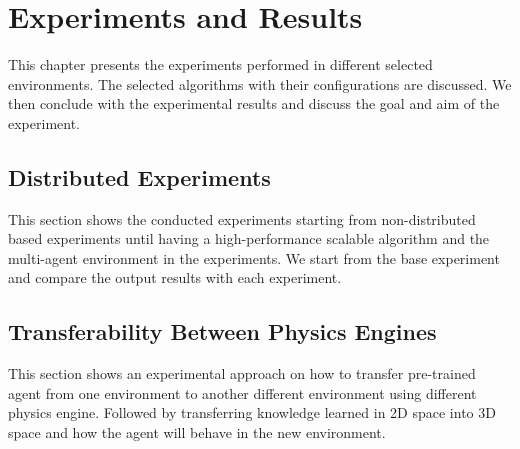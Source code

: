 
\chapter{Experiments and Results}\label{chapter:experiments}

This chapter presents the experiments performed in different selected environments. The selected algorithms with their configurations are discussed. We then conclude with the experimental results and discuss the goal and aim of the experiment.

\section{Distributed Experiments}

This section shows the conducted experiments starting from non-distributed based experiments until having a high-performance scalable algorithm and the multi-agent environment in the experiments. We start from the base experiment and compare the output results with each experiment.


\clearpage


\clearpage


\clearpage

\section{Transferability Between Physics Engines}

This section shows an experimental approach on how to transfer pre-trained agent from one environment to another different environment using different physics engine. Followed by transferring knowledge learned in 2D space into 3D space and how the agent will behave in the new environment.


\clearpage


\clearpage 